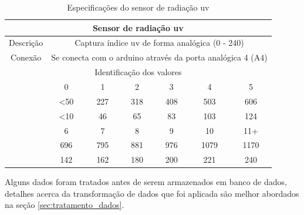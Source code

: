 \begin{center}
    \centering
    \begin{table}[H]
        \ABNTEXfontereduzida
        \caption{Especificações do sensor de radiação uv}
        \label{my-label}
        \begin{tabularx}{\textwidth}{p{5cm}|c|c|c|c|c|c}
    
        \hline
    
        \multicolumn{7}{c}{\textbf{Sensor de radiação uv}} \\

        \hline
        \multicolumn{1}{c}{Descrição} & \multicolumn{6}{c}{Captura índice uv de forma analógica (0 - 240)}  \\
    
        \hline
        \multicolumn{1}{c}{Conexão} & \multicolumn{6}{c}{Se conecta com o arduino através da porta analógica 4 (A4)} \\

        \hline

        \multicolumn{7}{c}{Identificação dos valores} \\

        \hline
        \centering{Índice UV} & 0 & 1 & 2 & 3 & 4 & 5 \\

        \hline
        \centering{Voltagem (mV)} & <50 & 227 & 318 & 408 & 503  & 606 \\

        \hline
        \centering{Valor analógico} & <10 & 46 & 65 & 83 & 103 & 124 \\

        \hline
        \centering{Índice UV} & 6   & 7   & 8   & 9   & 10   & 11+  \\

        \hline
        \centering{Voltagem (mV)} & 696 & 795 & 881 & 976 & 1079 & 1170 \\

        \hline
        \centering{Valor analógico} & 142 & 162 & 180 & 200 & 221 & 240 \\
    
        \hline
    
        \end{tabularx}
    \end{table}
\end{center}

Alguns dados foram tratados antes de serem armazenados em banco de dados, detalhes acerca da transformação de dados que foi aplicada são melhor abordados na seção \ref{sec:tratamento_dados}.

